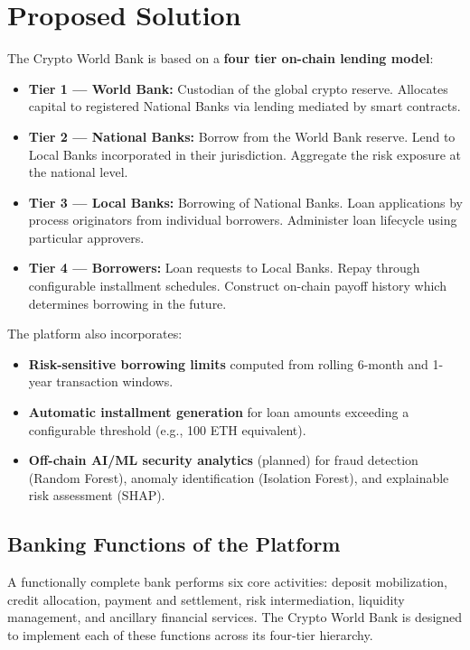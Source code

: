 \documentclass[12pt,a4paper]{report}
\begin{document}
\section{Proposed Solution}

The Crypto World Bank is based on a \textbf{four tier on-chain lending model}:

\begin{itemize}[noitemsep]
\item \textbf{Tier 1 --- World Bank:} Custodian of the global crypto reserve. Allocates capital to registered National Banks via lending mediated by smart contracts.
\item \textbf{Tier 2 --- National Banks:} Borrow from the World Bank reserve. Lend to Local Banks incorporated in their jurisdiction. Aggregate the risk exposure at the national level.
\item \textbf{Tier 3 --- Local Banks:} Borrowing of National Banks. Loan applications by process originators from individual borrowers. Administer loan lifecycle using particular approvers.
\item \textbf{Tier 4 --- Borrowers:} Loan requests to Local Banks. Repay through configurable installment schedules. Construct on-chain payoff history which determines borrowing in the future.
\end{itemize}

The platform also incorporates:

\begin{itemize}[noitemsep]
\item \textbf{Risk-sensitive borrowing limits} computed from rolling 6-month and 1-year transaction windows.
\item \textbf{Automatic installment generation} for loan amounts exceeding a configurable threshold (e.g., 100 ETH equivalent).
\item \textbf{Off-chain AI/ML security analytics} (planned) for fraud detection (Random Forest), anomaly identification (Isolation Forest), and explainable risk assessment (SHAP).
\end{itemize}

\subsection{Banking Functions of the Platform}

A functionally complete bank performs six core activities: deposit mobilization, credit allocation, payment and settlement, risk intermediation, liquidity management, and ancillary financial services. The Crypto World Bank is designed to implement each of these functions across its four-tier hierarchy.
\end{document}
